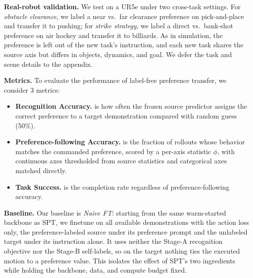 \documentclass{article}
\begin{document}
\textbf{Real-robot validation.}
We test on a UR5e under two cross-task settings. For \emph{obstacle clearance}, we label a near vs.\ far clearance preference on pick-and-place and transfer it to pushing; for \emph{strike strategy}, we label a direct vs.\ bank-shot preference on air hockey and transfer it to billiards. As in simulation, the preference is left out of the new task's instruction, and each new task shares the source axis but differs in objects, dynamics, and goal. We defer the task and scene details to the appendix.

\textbf{Metrics.}
To evaluate the performance of label-free preference transfer, we consider 3 metrics:
\begin{itemize}
    \item \textbf{Recognition Accuracy.} is how often the frozen source predictor assigns the correct preference to a target demonstration compared with random guess (50\%).
    \item \textbf{Preference-following Accuracy.} is the fraction of rollouts whose behavior matches the commanded preference, scored by a per-axis statistic $\phi$, with continuous axes thresholded from source statistics and categorical axes matched directly. 
    \item \textbf{Task Success.} is the completion rate regardless of preference-following accuracy.
\end{itemize}

\textbf{Baseline.}
Our baseline is \emph{Naive FT}: starting from the same warm-started backbone as
SPT, we finetune on all available demonstrations with the action loss only, the
preference-labeled source under its preference prompt and the unlabeled target
under its instruction alone. It uses neither the Stage-A recognition objective
nor the Stage-B self-labels, so on the target nothing ties the executed motion to
a preference value. This isolates the effect of SPT's two ingredients while
holding the backbone, data, and compute budget fixed.




\end{document}
